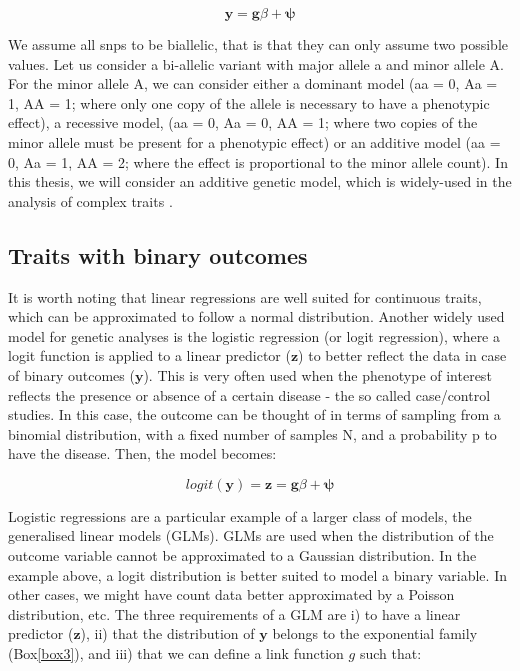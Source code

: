 \begin{equation}\label{eq:Linear_regression_genetics}
 \mathbf{y} = \mathbf{g}\beta + \boldsymbol{\psi} 
\end{equation}

We assume all \gls{snp}s to be biallelic, that is that they can only assume two possible values. 
Let us consider a bi-allelic variant with major allele a and minor allele A. For the minor allele A, we can consider either a dominant model (aa = 0, Aa = 1, AA = 1; where only one copy of the allele is necessary to have a phenotypic effect), a recessive model, (aa = 0, Aa = 0, AA = 1; where two copies of the minor allele must be present for a phenotypic effect) or an additive model (aa = 0, Aa = 1, AA = 2; where the effect is proportional to the minor allele count). 
In this thesis, we will consider an additive genetic model, which is widely-used in the analysis of complex traits \cite{laird2010fundamentals}.

\subsection{Traits with binary outcomes}

It is worth noting that linear regressions are well suited for continuous traits, which can be approximated to follow a normal distribution. 
Another widely used model for genetic analyses is the logistic regression (or logit regression), where a logit function is applied to a linear predictor ($\mathbf{z}$) to better reflect the data in case of binary outcomes ($\mathbf{y}$). 
This is very often used when the phenotype of interest reflects the presence or absence of a certain disease - the so called case/control studies.
In this case, the outcome can be thought of in terms of sampling from a binomial distribution, with a fixed number of samples N, and a probability p to have the disease. Then, the model becomes:

\begin{equation}\label{eq:Logistic_regression_genetics_z}
 logit(\mathbf{y}) = \mathbf{z} = \mathbf{g}\beta + \boldsymbol{\psi} 
\end{equation}

Logistic regressions are a particular example of a larger class of models, the generalised linear models (GLMs). 
GLMs are used when the distribution of the outcome variable cannot be approximated to a Gaussian distribution. 
In the example above, a logit distribution is better suited to model a binary variable. 
In other cases, we might have count data better approximated by a Poisson distribution, etc.
The three requirements of a GLM are i) to have a linear predictor ($\mathbf{z}$), ii) that the distribution of $\mathbf{y}$  belongs to the exponential family (Box\ref{box3}), and iii) that we can define a link function $g$ such that:

